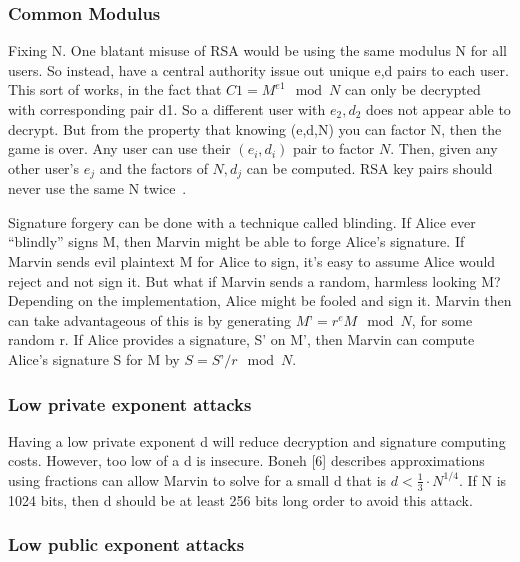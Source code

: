 \documentclass[12pt,journal,compsoc]{IEEEtran}
\begin{document}
\subsubsection{\qquad Common Modulus}
\label{sec:qquad-common-modulus}
Fixing N.  One blatant misuse of RSA would be using the same modulus N
for all users.  So instead, have a central authority issue out unique
e,d pairs to each user.  This sort of works, in the fact that $C1 =
M^{e1} \mod N$ can only be decrypted with corresponding pair d1. So a
different user with $e_{2},d_{2}$ does not appear able to decrypt. But from the
property that knowing (e,d,N) you can factor N, then the game is over.
Any user can use their $(e_{i}, d_{i})$ pair to factor $N$. Then,
given any other user’s $e_{j}$ and the factors of $N, d_{j}$ can be
computed. RSA key pairs should never use the same N
twice~\cite{boneh1999twenty}.
\par
Signature forgery can be done with a technique called blinding.  If
Alice ever “blindly” signs M, then Marvin might be able to forge
Alice’s signature.  If Marvin sends evil plaintext M for Alice to
sign, it’s easy to assume Alice would reject and not sign it.  But
what if Marvin sends a random, harmless looking M?  Depending on the
implementation, Alice might be fooled and sign it.  Marvin then can
take advantageous of this is by generating $M’ = r^{e} M \mod N$, for
some random r.  If Alice provides a signature, S’ on M’, then Marvin
can compute Alice’s signature S for M by $S = S’/r \mod N$.

\subsubsection{\qquad Low private exponent attacks}
\label{sec:qquad-low-private}

Having a low private exponent d will reduce decryption and signature
computing costs.  However, too low of a d is insecure.  Boneh [6]
describes approximations using fractions can allow Marvin to solve for
a small d that is $d < \frac{1}{3}\cdot N^{1/4}$. If N is 1024 bits,
then d should be at least 256 bits long order to avoid this attack. 

\subsubsection{\qquad Low public exponent attacks}
\label{sec:qquad-low-public}
\end{document}
